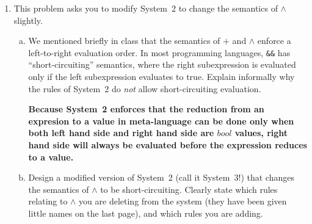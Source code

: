 \documentclass{article}
\newcommand{\meta}[1]{{\color{blue}#1}}
\begin{document}
\begin{enumerate}[leftmargin=*,itemindent=*,start=6,label={{\bf Problem \arabic*}.},ref=\arabic*]
\begin{enumerate}[(a)]
    \textbf{
      Theorem. For every expression $\meta{e}$, value $\meta{v}$, and type $\meta{\tau}$,
      if $\meta{e} \to^* \meta{v}$ and $\vdash \meta{v} : \meta{\tau}$,
      then $\vdash \meta{e} : \meta{\tau}$.
    }
    \begin{proof}
      By induction on $\meta{e} \to^* \meta{v}$.
      \begin{itemize}
        \item $\inferrule{ }{\meta{e} \to^* \meta{e}}$. In this case $\meta{e}$ is $\meta{v}$. Since $\vdash \meta{v} : \meta{\tau}$, $\vdash \meta{e} : \meta{\tau}$.
        \item $\inferrule{\meta{e} \to \meta{e^\prime} \\ \meta{e^\prime} \to^* \meta{v}}{\meta{e} \to^* \meta{v}}$. According to induction hypothesis, and assumptions that $\meta{e^\prime} \to^* \meta{v}$ and $\vdash \meta{v} : \meta{\tau}$, we can get $\vdash \meta{e^\prime} : \meta{\tau}$. According to the assumption that $\meta{e} \to \meta{e^\prime}$ and $\meta{e^\prime} : \meta{\tau}$ and \textit{Lemma 1} proved above, $\meta{e} : \meta{\tau}$ follows.
      \end{itemize}
    \end{proof}

  \end{enumerate}
\item\label{evalorder} This problem asks you to modify System~2 to change the semantics of $\wedge$ slightly.
  \begin{enumerate}[(a)]
  \item We mentioned briefly in class that the semantics of $+$ and $\wedge$ enforce a left-to-right
    evaluation order. In most programming languages, \texttt{\&\&} has ``short-circuiting'' semantics,
    where the right subexpression is evaluated only if the left subexpression evaluates to true. Explain
    informally why the rules of System~2 do \emph{not} allow short-circuiting evaluation.

    \textbf{
      Because System~2 enforces that the reduction from an expresion to a value in meta-language can be done only when both left hand side and right hand side are $bool$ values, right hand side will always be evaluated before the expression reduces to a value.
    }

  \item Design a modified version of System~2 (call it System~3!) that changes the semantics of $\wedge$ to be short-circuiting.
    Clearly state which rules relating to $\wedge$ you are deleting from the system (they have been given little names on the last page),
    and which rules you are adding.


\end{enumerate}
\end{enumerate}
\end{document}
